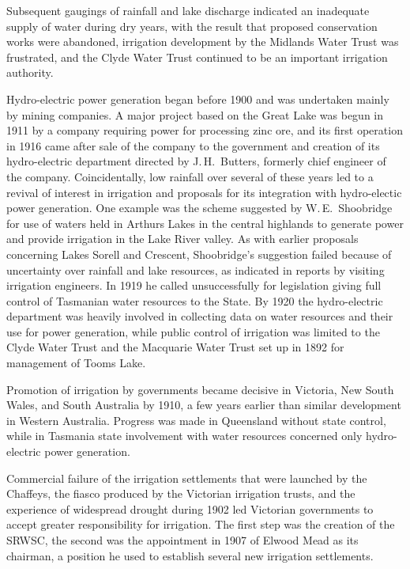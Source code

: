 Subsequent gaugings of rainfall and lake discharge indicated an
inadequate supply of water during dry years, with the result that
proposed conservation works were abandoned, irrigation development by
the Midlands Water Trust  was frustrated,
and the Clyde Water Trust continued to be an important irrigation
authority.

Hydro-electric power generation began before 1900 and was undertaken
mainly by mining companies.  A major project based on the Great Lake
 was begun in 1911 by a company requiring power for
processing zinc ore, and its first operation in 1916 came after sale
of the company to the government and creation of its hydro-electric
department directed by J.\,H.~Butters,  formerly
chief engineer of the company.  Coincidentally, low rainfall over
several of these years led to a revival of interest in irrigation and
proposals for its integration with hydro-electic power generation.
One example was the scheme suggested by W.\,E.~Shoobridge
 for use of
waters held in Arthurs Lakes  in the
central highlands to generate power and provide irrigation in the Lake
River
 valley.  As with earlier proposals concerning Lakes
Sorell and Crescent, Shoobridge's suggestion failed because of
uncertainty over rainfall and lake resources, as indicated in reports
by visiting irrigation engineers. In 1919 he called unsuccessfully for
legislation giving full control of Tasmanian water resources to the
State.  By 1920 the hydro-electric department was heavily involved in
collecting data on water resources and their use for power generation,
while public control of irrigation was limited to the Clyde Water
Trust and the Macquarie Water Trust  set
up in 1892 for management of  Tooms
Lake.


\closure
Promotion of irrigation by governments became decisive in Victoria,
New South Wales, and South Australia by 1910, a few years earlier than
similar development in Western Australia.  Progress was made in
Queensland without state control, while in Tasmania state involvement
with water resources concerned only hydro-electric power generation.

Commercial failure of the irrigation settlements that were launched by
the Chaffeys, the fiasco produced by the Victorian irrigation trusts,
and the experience of widespread drought during 1902 led Victorian
governments to accept greater responsibility for irrigation.  The
first step was the creation of the SRWSC, the second was the
appointment in 1907 of Elwood Mead as its chairman, a position he used
to establish several new irrigation settlements.


